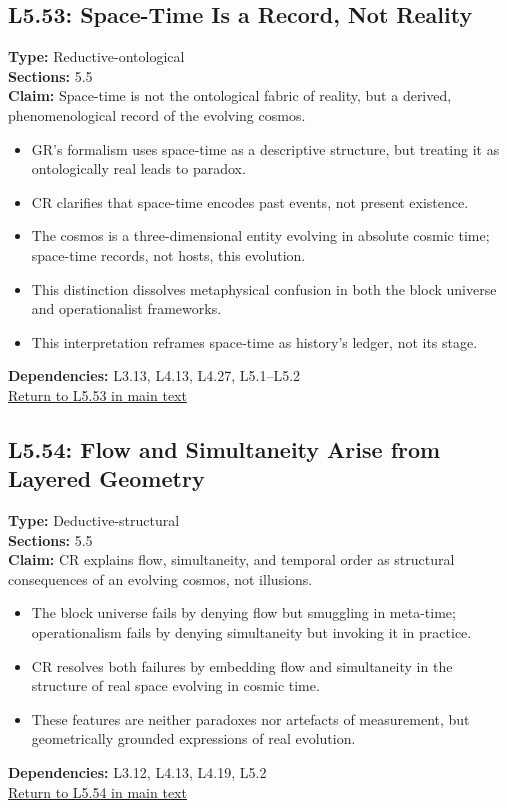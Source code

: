 \documentclass[12pt]{book}
\newcommand{\returnlink}[1]{\hyperref[logic:#1]{Return to #1 in main text}\xspace}
\begin{document}
\subsection*{L5.53: Space-Time Is a Record, Not Reality}
\label{appendix:L5.53}
\textbf{Type:} Reductive-ontological \\
\textbf{Sections:} 5.5 \\
\textbf{Claim:} Space-time is not the ontological fabric of reality, but a derived, phenomenological record of the evolving cosmos.
\begin{itemize}
  \item GR's formalism uses space-time as a descriptive structure, but treating it as ontologically real leads to paradox.
  \item CR clarifies that space-time encodes past events, not present existence.
  \item The cosmos is a three-dimensional entity evolving in absolute cosmic time; space-time records, not hosts, this evolution.
  \item This distinction dissolves metaphysical confusion in both the block universe and operationalist frameworks.
  \item This interpretation reframes space-time as history's ledger, not its stage.
\end{itemize}
\textbf{Dependencies:} L3.13, L4.13, L4.27, L5.1–L5.2 \\
\returnlink{L5.53}

\subsection*{L5.54: Flow and Simultaneity Arise from Layered Geometry}
\label{appendix:L5.54}
\textbf{Type:} Deductive-structural \\
\textbf{Sections:} 5.5 \\
\textbf{Claim:} CR explains flow, simultaneity, and temporal order as structural consequences of an evolving cosmos, not illusions.
\begin{itemize}
  \item The block universe fails by denying flow but smuggling in meta-time; operationalism fails by denying simultaneity but invoking it in practice.
  \item CR resolves both failures by embedding flow and simultaneity in the structure of real space evolving in cosmic time.
  \item These features are neither paradoxes nor artefacts of measurement, but geometrically grounded expressions of real evolution.
\end{itemize}
\textbf{Dependencies:} L3.12, L4.13, L4.19, L5.2 \\
\returnlink{L5.54}
\end{document}
